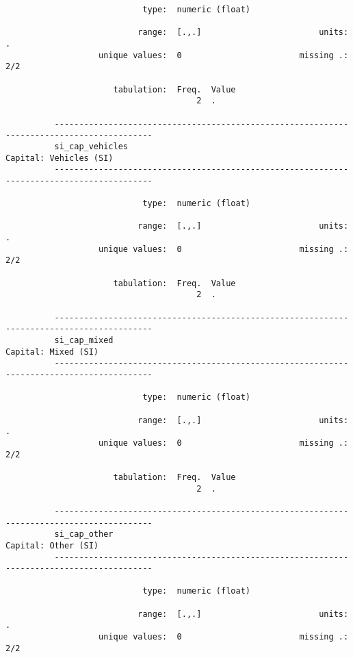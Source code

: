 \documentclass{article}
\begin{document}
\begin{verbatim}
                            type:  numeric (float)
          
                           range:  [.,.]                        units:  .
                   unique values:  0                        missing .:  2/2
          
                      tabulation:  Freq.  Value
                                       2  .
          
          ------------------------------------------------------------------------------------------
          si_cap_vehicles                                                     Capital: Vehicles (SI)
          ------------------------------------------------------------------------------------------
          
                            type:  numeric (float)
          
                           range:  [.,.]                        units:  .
                   unique values:  0                        missing .:  2/2
          
                      tabulation:  Freq.  Value
                                       2  .
          
          ------------------------------------------------------------------------------------------
          si_cap_mixed                                                           Capital: Mixed (SI)
          ------------------------------------------------------------------------------------------
          
                            type:  numeric (float)
          
                           range:  [.,.]                        units:  .
                   unique values:  0                        missing .:  2/2
          
                      tabulation:  Freq.  Value
                                       2  .
          
          ------------------------------------------------------------------------------------------
          si_cap_other                                                           Capital: Other (SI)
          ------------------------------------------------------------------------------------------
          
                            type:  numeric (float)
          
                           range:  [.,.]                        units:  .
                   unique values:  0                        missing .:  2/2
          

\end{verbatim}
\end{document}
